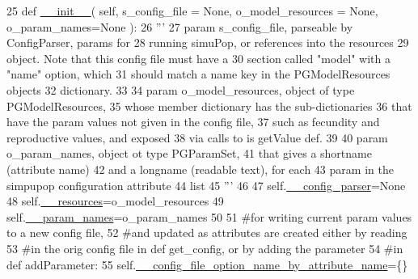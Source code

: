 \begin{DoxyCode}
25     \textcolor{keyword}{def }\hyperlink{classnegui_1_1pginputsimupop_1_1PGInputSimuPop_a1452a83a005c9d30e778b34ae67a399f}{\_\_init\_\_}( self, s\_config\_file = None, o\_model\_resources = None, o\_param\_names=None ):
26         \textcolor{stringliteral}{'''}
27 \textcolor{stringliteral}{        param s\_config\_file, parseable by ConfigParser, params for }
28 \textcolor{stringliteral}{            running simuPop, or references into the resources}
29 \textcolor{stringliteral}{            object.  Note that this config file must have a}
30 \textcolor{stringliteral}{            section called "model" with a "name" option, which}
31 \textcolor{stringliteral}{            should match a name key in the PGModelResources objects}
32 \textcolor{stringliteral}{            dictionary.}
33 \textcolor{stringliteral}{}
34 \textcolor{stringliteral}{        param o\_model\_resources, object of type PGModelResources,}
35 \textcolor{stringliteral}{            whose member dictionary has the sub-dictionaries}
36 \textcolor{stringliteral}{            that have the param values not given in the config file,}
37 \textcolor{stringliteral}{            such as fecundity and reproductive values, and exposed}
38 \textcolor{stringliteral}{            via calls to is getValue def.}
39 \textcolor{stringliteral}{}
40 \textcolor{stringliteral}{        param o\_param\_names, object ot type PGParamSet,}
41 \textcolor{stringliteral}{            that gives a shortname (attribute name)}
42 \textcolor{stringliteral}{            and a longname (readable text), for each }
43 \textcolor{stringliteral}{            param in the simpupop configuration attribute }
44 \textcolor{stringliteral}{            list}
45 \textcolor{stringliteral}{        '''}
46 
47         self.\hyperlink{classnegui_1_1pginputsimupop_1_1PGInputSimuPop_af6628ecaa63a594fc96d1b9273fd1fd6}{\_\_config\_parser}=\textcolor{keywordtype}{None}
48         self.\hyperlink{classnegui_1_1pginputsimupop_1_1PGInputSimuPop_a6c00be5e58b61b239273e04c671cd9e8}{\_\_resources}=o\_model\_resources
49         self.\hyperlink{classnegui_1_1pginputsimupop_1_1PGInputSimuPop_a0a737393cb4d1c66062f9403296c7f19}{\_\_param\_names}=o\_param\_names
50 
51         \textcolor{comment}{#for writing current param values to a new config file,}
52         \textcolor{comment}{#and updated as attributes are created either by reading}
53         \textcolor{comment}{#in the orig config file in def get\_config, or by adding the parameter}
54         \textcolor{comment}{#in def addParameter:}
55         self.\hyperlink{classnegui_1_1pginputsimupop_1_1PGInputSimuPop_a893ab501191e9e1ed89f4f878310d97b}{\_\_config\_file\_option\_name\_by\_attribute\_name}=\{\}      

\end{DoxyCode}
